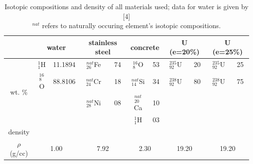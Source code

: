\documentclass[a4paper, 11pt]{article}
\begin{document}
\begin{appendices}
\begin{table}[H]
\centering
\begin{tabular}{c|cc|cc|cc|cc|cc}
	                                & \multicolumn{2}{c}{water} & \multicolumn{2}{c}{stainless steel}&\multicolumn{2}{c}{concrete}&\multicolumn{2}{c}{U (e=20\%)}&\multicolumn{2}{c}{U (e=25\%)}\\
	                                \hline
	\multirow{4}{*}{wt. \%}			&${}^{1}_{1}$H	&11.1894	&${}^{nat}_{26}$Fe	&74		&${}^{16}_{8}$O		&53		&${}^{235}_{92}$U&20	&${}^{235}_{92}$U&25	\\
									&${}^{16}_{8}$O	&88.8106	&${}^{nat}_{24}$Cr	&18		&${}^{nat}_{14}$Si	&34		&${}^{238}_{92}$U&80	&${}^{238}_{92}$U&75	\\
									&				&			&${}^{nat}_{28}$Ni	&08		&${}^{nat}_{20}$Ca	&10		&						&				&		\\
									&				&			&					&		&${}^{1}_{1}$H		&03		&						&				&		\\
\hline	density						\\
		$\rho$ (g/cc)				&	\multicolumn{2}{c}{1.00}&	\multicolumn{2}{c}{7.92}&	\multicolumn{2}{c}{2.30}&	\multicolumn{2}{c}{19.20}&	\multicolumn{2}{c}{19.20}\\
\end{tabular}
\caption{Isotopic compositions and density of all materials used; data for water is given by [4]
\\${}^{nat}$ refers to naturally occuring element's isotopic compositions.}\label{MaterialDef}
\end{table}



\end{appendices}
\end{document}
